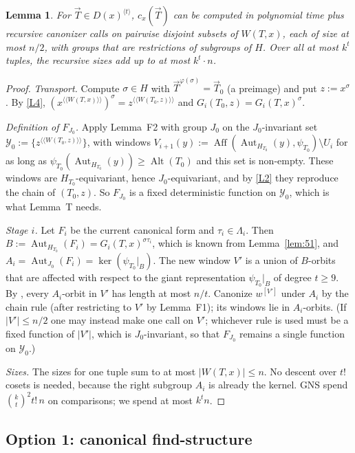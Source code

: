 \documentclass[11pt]{article}
\theoremstyle{plain}
\newtheorem{lemma}[theorem]{Lemma}
\theoremstyle{definition}
\theoremstyle{remark}
\theoremstyle{named}
\theoremstyle{namedrm}
\newcommand{\Alt}{\operatorname{Alt}}
\newcommand{\Aut}{\operatorname{Aut}}
\newcommand{\Aff}{\operatorname{Aff}}
\newcommand{\cY}{\mathcal{Y}}
\newcommand{\vT}{\vec{T}}
\newcommand{\win}[2]{#1^{[#2]}}
\newcommand{\lay}[2]{#1^{\langle\!\langle #2\rangle\!\rangle}}
\begin{document}
\begin{lemma}\label{lem:Tpp}
For $\vT\in D(x)^{\langle t\rangle}$, $c_x(\vT)$ can be computed in polynomial time plus recursive canonizer
calls on pairwise disjoint subsets of $W(T,x)$, each of size at most $n/2$, with groups that are
restrictions of subgroups of $H$. Over all at most $k^t$ tuples, the recursive sizes add up to at most
$k^t\cdot n$.
\end{lemma}
\begin{proof}
\emph{Transport.} Compute $\sigma\in H$ with $\vT^{\varphi(\sigma)}=\vT_0$ (a preimage) and put $z:=x^\sigma$. By
\ref{L4}, $(\lay{x}{W(T,x)})^\sigma=\lay{z}{W(T_0,z)}$ and $G_i(T_0,z)=G_i(T,x)^\sigma$.

\emph{Definition of $F_{J_0}$.} Apply Lemma~F2 with group $J_0$ on the $J_0$-invariant set
$\cY_0:=\{\lay{z}{W(T_0,z)}\}$, with windows
$V_{i+1}(y):=\Aff(\Aut_{H_{T_0}}(y),\psi_{T_0})\setminus U_i$ for as long as
$\psi_{T_0}(\Aut_{H_{T_0}}(y))\ge\Alt(T_0)$ and this set is non-empty. These windows are $H_{T_0}$-equivariant,
hence $J_0$-equivariant, and by \ref{L2} they reproduce the chain of $(T_0,z)$. So $F_{J_0}$ is a fixed
deterministic function on $\cY_0$, which is what Lemma~T needs.

\emph{Stage $i$.} Let $F_i$ be the current canonical form and $\tau_i\in\Lambda_i$. Then
$B:=\Aut_{H_{T_0}}(F_i)=G_i(T,x)^{\sigma\tau_i}$, which is known from Lemma~\ref{lem:51}, and
$A_i=\Aut_{J_0}(F_i)=\ker(\psi_{T_0}|_B)$. The new window $V'$ is a union of $B$-orbits that are affected
with respect to the giant representation $\psi_{T_0}|_B$ of degree $t\ge9$. By \cite[Thm.~5.9]{GNS}, every
$A_i$-orbit in $V'$ has length at most $n/t$. Canonize $\win{w}{V'}$ under $A_i$ by the chain rule (after
restricting to $V'$ by Lemma~F1); its windows lie in $A_i$-orbits. (If $|V'|\le n/2$ one may instead make
one call on $V'$; whichever rule is used must be a fixed function of $|V'|$, which is $J_0$-invariant, so
that $F_{J_0}$ remains a single function on $\cY_0$.)

\emph{Sizes.} The sizes for one tuple sum to at most $|W(T,x)|\le n$. No descent over $t!$ cosets is
needed, because the right subgroup $A_i$ is already the kernel. GNS spend
$\binom kt^2t!\,n$ on comparisons; we spend at most $k^t n$.
\end{proof}

\subsection{Option 1: canonical find-structure}
\end{document}
